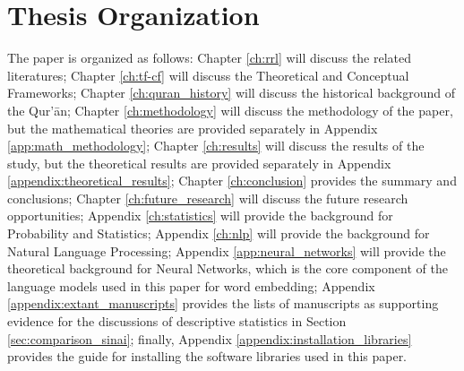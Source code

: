 \section{Thesis Organization}
The paper is organized as follows: Chapter \ref{ch:rrl} will discuss the related literatures; Chapter \ref{ch:tf-cf} will discuss the Theoretical and Conceptual Frameworks; Chapter \ref{ch:quran_history} will discuss the historical background of the Qur'\=an; Chapter \ref{ch:methodology} will discuss the methodology of the paper, but the mathematical theories are provided separately in Appendix \ref{app:math_methodology}; Chapter \ref{ch:results} will discuss the results of the study, but the theoretical results are provided separately in Appendix \ref{appendix:theoretical_results}; Chapter \ref{ch:conclusion} provides the summary and conclusions; Chapter \ref{ch:future_research} will discuss the future research opportunities; Appendix \ref{ch:statistics} will provide the background for Probability and Statistics; Appendix \ref{ch:nlp} will provide the background for Natural Language Processing; Appendix \ref{app:neural_networks} will provide the theoretical background for Neural Networks, which is the core component of the language models used in this paper for word embedding; Appendix \ref{appendix:extant_manuscripts} provides the lists of manuscripts as supporting evidence for the discussions of descriptive statistics in Section \ref{sec:comparison_sinai}; finally, Appendix \ref{appendix:installation_libraries} provides the guide for installing the software libraries used in this paper.
